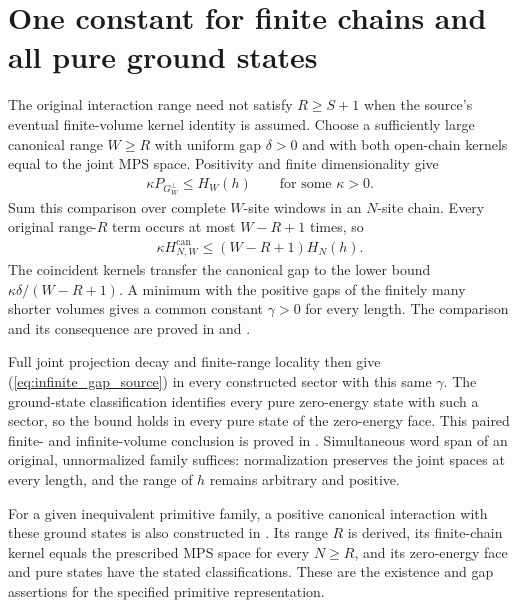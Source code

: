 \documentclass{article}
\begin{document}
\section{One constant for finite chains and all pure ground states}
The original interaction range need not satisfy $R\geq S+1$ when the
source's eventual finite-volume kernel identity is assumed. Choose a
sufficiently large canonical range $W\geq R$ with uniform gap $\delta>0$
and with both open-chain kernels equal to the joint MPS space. Positivity
and finite dimensionality give
\begin{align}
  \kappa P_{G_W^\perp}\leq H_W(h)
  \qquad\text{for some }\kappa>0.
\end{align}
Sum this comparison over complete $W$-site windows in an $N$-site chain.
Every original range-$R$ term occurs at most $W-R+1$ times, so
\begin{align}
  \kappa H_{N,W}^{\mathrm{can}}
    \leq (W-R+1)H_N(h).
\end{align}
The coincident kernels transfer the canonical gap to the lower bound
$\kappa\delta/(W-R+1)$. A minimum with the positive gaps of the finitely
many shorter volumes gives a common constant $\gamma>0$ for every length.
The comparison and its consequence are proved in
and .

Full joint projection decay and finite-range locality then give
(\ref{eq:infinite_gap_source}) in every constructed sector with this same
$\gamma$. The ground-state classification identifies every pure zero-energy
state with such a sector, so the bound holds in every pure state of the
zero-energy face. This paired finite- and infinite-volume conclusion is
proved in .
Simultaneous word span of an original, unnormalized family suffices:
normalization preserves the joint spaces at every length, and the range of
$h$ remains arbitrary and positive.

For a given inequivalent primitive family, a positive canonical interaction
with these ground states is also constructed in
.
Its range $R$ is derived, its finite-chain kernel equals the prescribed MPS
space for every $N\geq R$, and its zero-energy face and pure states have the
stated classifications. These are the existence and gap assertions for the
specified primitive representation.
\end{document}
